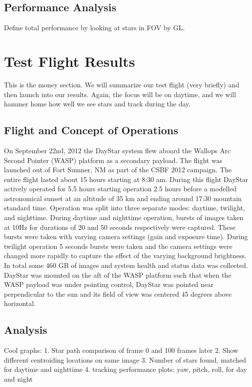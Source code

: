 \documentclass[twocolumn,letterpaper]{IEEEAerospace2012}
\begin{document}
\subsection{Performance Analysis}





Define total performance by looking at stars in FOV by GL.



\section{Test Flight Results}
This is the money section. We will summarize our test flight (very briefly) and then launch into our results. Again, the focus will be on daytime, and we will hammer home how well we see stars and track during the day.

\subsection{Flight and Concept of Operations}
On September 22nd, 2012 the DayStar system flew aboard the Wallops Arc Second Pointer (WASP) platform as a secondary payload. The flight was launched out of Fort Sumner, NM as part of the CSBF 2012 campaign. The entire flight lasted about 15 hours starting at 8:30 am. During this flight DayStar actively operated for 5.5 hours starting operation 2.5 hours before a modelled astronomical sunset at an altitude of 35 km and ending around 17:30 mountain standard time. Operation was split into three separate modes: daytime, twilight, and nighttime. During daytime and nighttime operation, bursts of images taken at 10Hz for durations of 20 and 50 seconds respectively were captured. These bursts were taken with varying camera settings (gain and exposure time). During twilight operation 5 seconds bursts were taken and the camera settings were changed more rapidly to capture the effect of the varying background brightness. In total some 460 GB of images and system health and status data was collected. DayStar was 
mounted on the aft of the WASP platform such that when the WASP payload was under pointing control, DayStar was pointed near perpendicular to the sun and its field of view was centered 45 degrees above horizontal.

\subsection{Analysis}
Cool graphs:
1. Star path comparison of frame 0 and 100 frames later
2. Show different centroiding locations on same image
3. Number of stars found, matched for daytime and nighttime  
4. tracking performance plots: yaw, pitch, roll, for day and night
\end{document}
